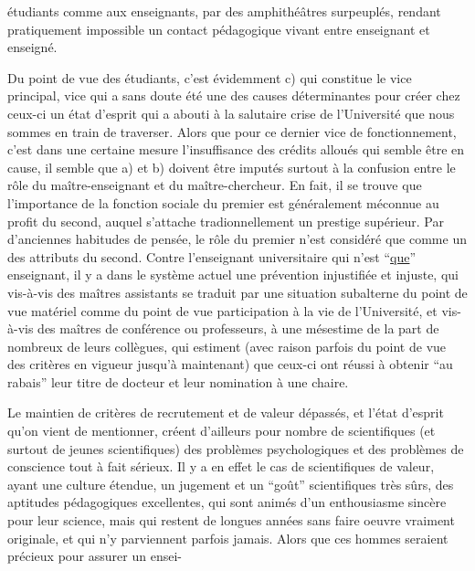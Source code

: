 
étudiants comme aux enseignants, par des amphithéâtres surpeuplés, rendant
pratiquement impossible un contact pédagogique vivant entre enseignant et
enseigné.

Du point de vue des étudiants, c'est évidemment c) qui constitue le
vice principal, vice qui a sans doute été une des causes déterminantes pour
créer chez ceux-ci un état d'esprit qui a abouti à la salutaire crise de
l'Université que nous sommes en train de traverser. Alors que pour ce dernier
vice de fonctionnement, c'est dans une certaine mesure l'insuffisance des crédits
alloués qui semble être en cause, il semble que a) et b) doivent être imputés
surtout à la confusion entre le rôle du maître-enseignant et du maître-chercheur.
En fait, il se trouve que l'importance de la fonction sociale du premier est
généralement méconnue au profit du second, auquel s'attache tradionnellement
un prestige supérieur. Par d'anciennes habitudes de pensée, le rôle du premier
n'est considéré que comme un des attributs du second. Contre l'enseignant
universitaire qui n'est ``\uline{que}'' enseignant, il y a dans le système actuel une
prévention injustifiée et injuste, qui vis-à-vis des maîtres assistants se
traduit par une situation subalterne du point de vue matériel comme du point
de vue participation à la vie de l'Université, et vis-à-vis des maîtres de
conférence ou professeurs, à une mésestime de la part de nombreux de leurs
collègues, qui estiment (avec raison parfois du point de vue des critères
en vigueur jusqu'à maintenant) que ceux-ci ont réussi à obtenir ``au rabais''
leur titre de docteur et leur nomination à une chaire.

Le maintien de critères de recrutement et de valeur dépassés, et
l'état d'esprit qu'on vient de mentionner, créent d'ailleurs pour nombre de
scientifiques (et surtout de jeunes scientifiques) des problèmes psychologiques
et des problèmes de conscience tout à fait sérieux. Il y a en effet le cas
de scientifiques de valeur, ayant une culture étendue, un jugement et un
``goût'' scientifiques très sûrs, des aptitudes pédagogiques excellentes, qui
sont animés d'un enthousiasme sincère pour leur science, mais qui restent
de longues années sans faire oeuvre vraiment originale, et qui n'y parviennent
parfois jamais. Alors que ces hommes seraient précieux pour assurer un ensei-%

